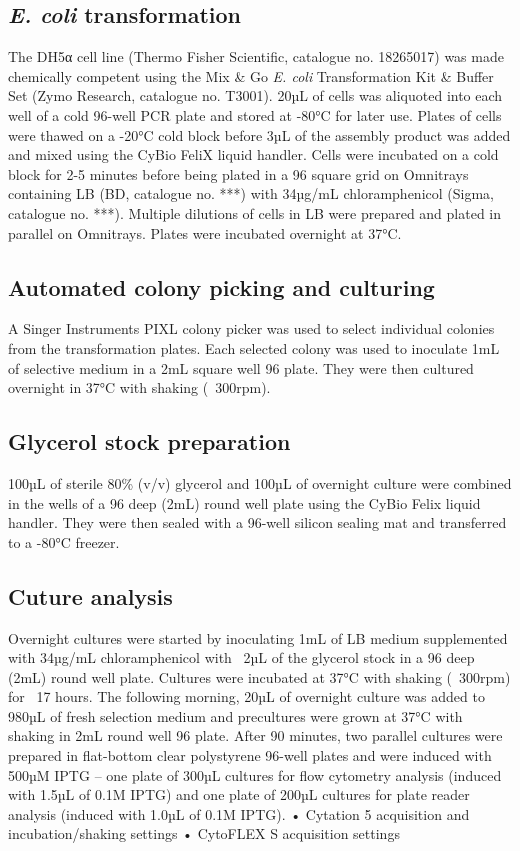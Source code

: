 \subsection{\textit{E. coli} transformation}
The DH5α cell line (Thermo Fisher Scientific, catalogue no. 18265017) was made chemically competent using the Mix & Go \textit{E. coli} Transformation Kit & Buffer Set (Zymo Research, catalogue no. T3001). 20µL of cells was aliquoted into each well of a cold 96-well PCR plate and stored at -80°C for later use. Plates of cells were thawed on a -20°C cold block before 3µL of the assembly product was added and mixed using the CyBio FeliX liquid handler. Cells were incubated on a cold block for 2-5 minutes before being plated in a 96 square grid on Omnitrays containing LB (BD, catalogue no. ***) with 34µg/mL chloramphenicol (Sigma, catalogue no. ***). Multiple dilutions of cells in LB were prepared and plated in parallel on Omnitrays. Plates were incubated overnight at 37°C.

\subsection{Automated colony picking and culturing}
A Singer Instruments PIXL colony picker was used to select individual colonies from the transformation plates. Each selected colony was used to inoculate 1mL of selective medium in a 2mL square well 96 plate. They were then cultured overnight in 37°C with shaking (~300rpm).

\subsection{Glycerol stock preparation}
100µL of sterile 80\% (v/v) glycerol and 100µL of overnight culture were combined in the wells of a 96 deep (2mL) round well plate using the CyBio Felix liquid handler. They were then sealed with a 96-well silicon sealing mat and transferred to a -80°C freezer. 

\subsection{Cuture analysis}
Overnight cultures were started by inoculating 1mL of LB medium supplemented with 34µg/mL chloramphenicol with ~2µL of the glycerol stock in a 96 deep (2mL) round well plate. Cultures were incubated at 37°C with shaking (~300rpm) for ~17 hours. The following morning, 20µL of overnight culture was added to 980µL of fresh selection medium and precultures were grown at 37°C with shaking in 2mL round well 96 plate. 
After 90 minutes, two parallel cultures were prepared in flat-bottom clear polystyrene 96-well plates and were induced with 500µM IPTG – one plate of 300µL cultures for flow cytometry analysis (induced with 1.5µL of 0.1M IPTG) and one plate of 200µL cultures for plate reader analysis (induced with 1.0µL of 0.1M IPTG).
•	Cytation 5 acquisition and incubation/shaking settings
•	CytoFLEX S acquisition settings

